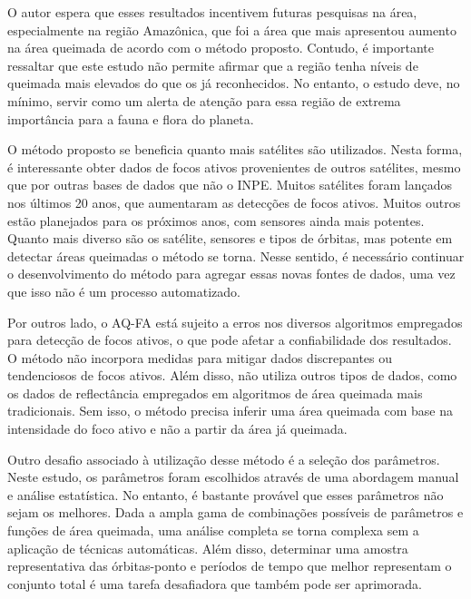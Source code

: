 \documentclass[cic,tc]{iiufrgs}
\begin{document}
O autor espera que esses resultados incentivem futuras pesquisas na área, especialmente na região Amazônica, que foi a área que mais apresentou aumento na área queimada de acordo com o método proposto. Contudo, é importante ressaltar que este estudo não permite afirmar que a região tenha níveis de queimada mais elevados do que os já reconhecidos. No entanto, o estudo deve, no mínimo, servir como um alerta de atenção para essa região de extrema importância para a fauna e flora do planeta.


O método proposto se beneficia quanto mais satélites são utilizados. Nesta forma, é interessante obter dados de focos ativos provenientes de outros satélites, mesmo que por outras bases de dados que não o INPE. Muitos satélites foram lançados nos últimos 20 anos, que aumentaram as detecções de focos ativos. Muitos outros estão planejados para os próximos anos, com sensores ainda mais potentes. Quanto mais diverso são os satélite, sensores e tipos de órbitas, mas potente em detectar áreas queimadas o método se torna. Nesse sentido, é necessário continuar o desenvolvimento do método para agregar essas novas fontes de dados, uma vez que isso não é um processo automatizado.

Por outros lado, o AQ-FA está sujeito a erros nos diversos algoritmos empregados para detecção de focos ativos, o que pode afetar a confiabilidade dos resultados.  O método não incorpora medidas para mitigar dados discrepantes ou tendenciosos de focos ativos. Além disso, não utiliza outros tipos de dados, como os dados de reflectância empregados em algoritmos de área queimada mais tradicionais. Sem isso, o método precisa inferir uma área queimada com base na intensidade do foco ativo e não a partir da área já queimada.

Outro desafio associado à utilização desse método é a seleção dos parâmetros. Neste estudo, os parâmetros foram escolhidos através de uma abordagem manual e análise estatística. No entanto, é bastante provável que esses parâmetros não sejam os melhores. Dada a ampla gama de combinações possíveis de parâmetros e funções de área queimada, uma análise completa se torna complexa sem a aplicação de técnicas automáticas. Além disso, determinar uma amostra representativa das órbitas-ponto e períodos de tempo que melhor representam o conjunto total é uma tarefa desafiadora que também pode ser aprimorada.

\end{document}
